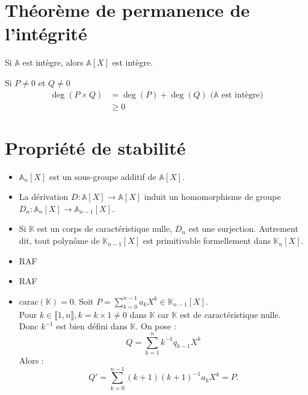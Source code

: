 \documentclass[../main.tex]{subfiles}
\begin{document}
\setcounter{section}{35}
\section{Théorème de permanence de l'intégrité}

\begin{tcolorbox}[title=Corollaire 13.36, title filled=false, colframe=orange, colback=orange!10!white]
    Si $\mathbb{A}$ est intègre, alors $\mathbb{A}[X]$ est intègre. 
\end{tcolorbox}

Si $P \neq 0$ et $Q \neq 0$
\begin{align*}
    \deg(P \times Q) &= \deg(P) + \deg(Q) \text{ ($\mathbb{A}$ est intègre)}\\
    &\geq 0
\end{align*}

\setcounter{section}{38}
\section{Propriété de stabilité}

\begin{tcolorbox}[title=Corollaire 13.39, title filled=false, colframe=orange, colback=orange!10!white]
    \begin{itemize}
        \item $\mathbb{A}_n [X]$ est un sous-groupe additif de $\mathbb{A}[X]$.
        \item La dérivation $D:\mathbb{A}[X] \to \mathbb{A}[X]$ induit un homomorphisme de groupe $D_n: \mathbb{A}_n[X] \to \mathbb{A}_{n-1}[X]$. 
        \item Si $\mathbb{K}$ est un corps de caractéristique nulle, $D_n$ est une surjection. Autrement dit, tout polynôme de $\mathbb{K}_{n-1}[X]$ est primitivable formellement dans $\mathbb{K}_n[X]$. 
    \end{itemize}
\end{tcolorbox}

\begin{itemize}
    \item RAF
    \item RAF
    \item $\text{carac}(\mathbb{K}) = 0$. Soit $P = \sum\limits_{k=0}^{n-1} a_k X^k \in \mathbb{K}_{n-1} [X]$. \\
    Pour $k \in \llbracket 1, n \rrbracket, k = k \times 1 \neq 0$ dans $\mathbb{K}$ car $\mathbb{K}$ est de caractéristique nulle. \\
    Donc $k^{-1}$ est bien défini dans $\mathbb{K}$. 
    On pose : 
    $$Q = \sum_{k=1}^{n} k^{-1} q_{k-1} X^k$$
    Alors : 
    $$Q' = \sum_{k=0}^{n-1} (k+1)(k+1)^{-1} a_k X^k = P.$$
\end{itemize}
\end{document}
